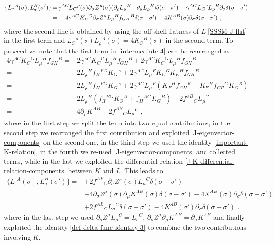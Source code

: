 \documentclass[12pt]{article}
\numberwithin{equation}{section}
\begin{document}
\begin{align}\label{intermediate-4}
\{ L_{\tau}{}^{A}(\sigma),L_{\sigma}^{B}(\sigma') \} =& \gamma^{AC}L_{C}{}^{\rho}(\sigma) \partial_{\sigma}Z^{\mu}(\sigma)(\partial_{\rho}L_{\mu}{}^{B}\!-\!\partial_{\mu}L_{\rho}{}^{B})\delta(\sigma\!-\!\sigma')-\gamma^{AC}L_{C}{}^{\rho}L_{\rho}{}^{B}\partial_{\sigma}\delta(\sigma\!-\!\sigma')
\notag\\
=&-4\gamma^{AC} K_{C}{}^{G}\partial_{\sigma}Z^{\mu}L_{\mu}{}^{H}f_{GH}{}^{B}\delta(\sigma\!-\!\sigma')-4K^{AB}(\sigma)\partial_{\sigma}\delta(\sigma\!-\!\sigma') \,\, ,
\end{align}
where the second line is obtained by using the off-shell flatness of $L$ \eqref{SSSM-J-flat} in the first term and $L_{C}{}^{\rho}(\sigma)L_{\rho}{}^{B}(\sigma)=4K_{C}{}^{B}(\sigma)$ in the second term. To proceed we note that the first term in \eqref{intermediate-4} can be rearranged as
\begin{equation}
\begin{aligned}
4\gamma^{AC}K_{C}{}^{G}L_{\mu}{}^{H}f_{GH}{}^{B}=& 2\gamma^{AC}K_{C}{}^{G}L_{\mu}{}^{H}f_{GH}{}^{B}+2\gamma^{AC}K_{C}{}^{G}L_{\mu}{}^{H}f_{GH}{}^{B}
\\
=&2L_{\mu}{}^{H}f_{H}{}^{BG}K_{G}{}^{A}+2\gamma^{AC}L_{\mu}{}^{E}K_{C}{}^{G}K_{E}{}^{H}f_{GH}{}^{B}
\\
=& 2L_{\mu}{}^{H}f_{H}{}^{BG}K_{G}{}^{A}+2\gamma^{AC}L_{\mu}{}^{E}(K_{E}{}^{H}f_{CH}{}^{B}-K_{E}{}^{H}f_{CH}{}^{G}K_{G}{}^{B})
\\
=&2L_{\mu}{}^{H}(f_{H}{}^{BG}K_{G}{}^{A}+f_{H}{}^{AG}K_{G}{}^{B})-2f^{AB}{}_{C}L_{\mu}{}^{C}
\\
=& 4\partial_{\mu} K^{AB} -2f^{AB}{}_{C}L_{\mu}{}^{C} \,\, ,
\end{aligned}
\end{equation}
where in the first step we split the term into two equal contributions, in the second step we rearranged the first contribution and exploited \eqref{J-eigenvector-components} on the second one, in the third step we used the identity \eqref{important-K-relation}, in the fourth we re-used \eqref{J-eigenvector-components} and collected terms, while in the last we exploited the differential relation \eqref{J-K-differential-relation-components} between $K$ and $L$. This leads to
\begin{equation}
\begin{aligned}
\{ L_{\tau}{}^{A}(\sigma),L_{\sigma}^{B}(\sigma') \}=&+2f^{AB}{}_{C}\partial_{\sigma}Z^{\mu}(\sigma)L_{\mu}{}^{C}\delta(\sigma-\sigma')
\\
&-4\partial_{\sigma}Z^{\mu}(\sigma) \partial_{\mu}K^{AB}(\sigma)\delta(\sigma-\sigma')-4K^{AB}(\sigma)\partial_{\sigma}\delta(\sigma-\sigma')
\\
=& +2f^{AB}{}_{C}L_{\sigma}{}^{C}\delta(\sigma-\sigma')-4K^{AB}(\sigma')\partial_{\sigma}\delta(\sigma-\sigma') \,\, ,
\end{aligned}
\end{equation}
where in the last step we used $\partial_{\sigma}Z^{\mu}L_{\mu}{}^{C}=L_{\sigma}{}^{C}$, $\partial_{\sigma}Z^{\mu}\partial_{\mu}K^{AB}=\partial_{\sigma}K^{AB}$ and finally exploited the identity \eqref{def-delta-func-identity-3} to combine the two contributions involving $K$.
\end{document}
